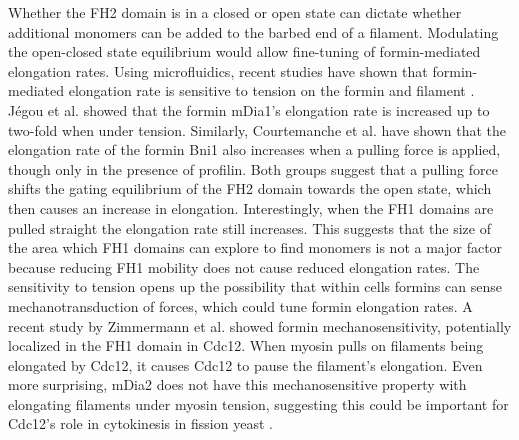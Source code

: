 Whether the FH2 domain is in a closed or open state can dictate whether additional monomers can be added to the barbed end of a filament. Modulating the open-closed state equilibrium would allow fine-tuning of formin-mediated elongation rates. Using microfluidics, recent studies have shown that formin-mediated elongation rate is sensitive to tension on the formin and filament \citep{courtemanche_tension_2013,jegou_formin_2013}. Jégou et al. showed that the formin mDia1's elongation rate is increased up to two-fold when under tension. Similarly, Courtemanche et al. have shown that the elongation rate of the formin Bni1 also increases when a pulling force is applied, though only in the presence of profilin. Both groups suggest that a pulling force shifts the gating equilibrium of the FH2 domain towards the open state, which then causes an increase in elongation. Interestingly, when the FH1 domains are pulled straight the elongation rate still increases. This suggests that the size of the area which FH1 domains can explore to find monomers is not a major factor because reducing FH1 mobility does not cause reduced elongation rates.  The sensitivity to tension opens up the possibility that within cells formins can sense mechanotransduction of forces, which could tune formin elongation rates. A recent study by Zimmermann et al. showed formin mechanosensitivity, potentially localized in the FH1 domain in Cdc12. When myosin pulls on filaments being elongated by Cdc12, it causes Cdc12 to pause the filament's elongation. Even more surprising, mDia2 does not have this mechanosensitive property with elongating filaments under myosin tension, suggesting this could be important for Cdc12's role in cytokinesis in fission yeast \citep{zimmermann_mechanoregulated_2017}. 

